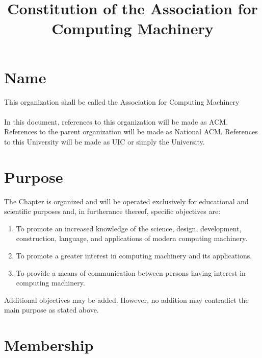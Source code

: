 \documentclass[12pt,titlepage]{article}
\begin{document}
\title{Constitution of the Association for Computing Machinery}
\maketitle

\tableofcontents

\pagebreak

\section{Name}

This organization shall be called the Association for Computing Machinery\\
\\
In this document, references to this organization will be made as ACM. References to the parent organization will be made as National ACM. References to this University will be made as UIC or simply the University.

\section{Purpose}

The Chapter is organized and will be operated exclusively for educational and scientific purposes and, in furtherance thereof, specific objectives are:
\begin{enumerate}
\item To promote an increased knowledge of the science, design, development, construction, language, and applications of modern computing machinery.
\item To promote a greater interest in computing machinery and its applications.
\item To provide a means of communication between persons having interest in computing machinery.
\end{enumerate}
Additional objectives may be added. However, no addition may contradict the main purpose as stated above.

\section{Membership}
\end{document}
